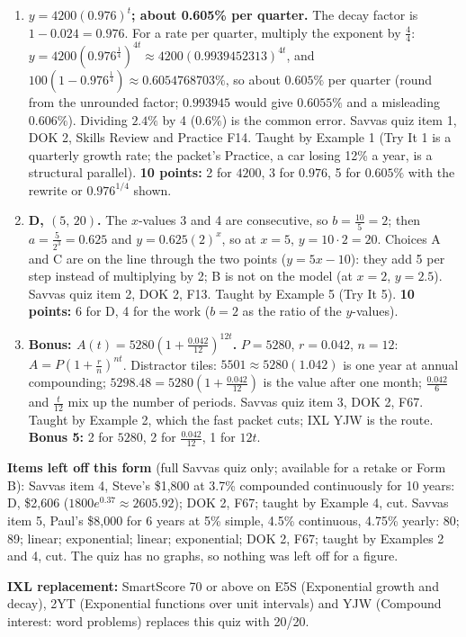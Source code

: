 \documentclass[11pt]{article}
\begin{document}
\begin{enumerate}
\item[\textbf{1.}] \textbf{$y=4200(0.976)^t$; about 0.605\% per quarter.} The decay factor is $1-0.024=0.976$. For a rate per quarter, multiply the exponent by $\frac44$: $y=4200\left(0.976^{\frac14}\right)^{4t}\approx4200(0.9939452313)^{4t}$, and $100\left(1-0.976^{\frac14}\right)\approx0.6054768703\%$, so about $0.605\%$ per quarter (round from the unrounded factor; $0.993945$ would give $0.6055\%$ and a misleading $0.606\%$). Dividing $2.4\%$ by 4 ($0.6\%$) is the common error. Savvas quiz item 1, DOK 2, Skills Review and Practice F14. Taught by Example 1 (Try It 1 is a quarterly growth rate; the packet's Practice, a car losing 12\% a year, is a structural parallel). \textbf{10 points:} 2 for $4200$, 3 for $0.976$, 5 for $0.605\%$ with the rewrite or $0.976^{1/4}$ shown.
\item[\textbf{2.}] \textbf{D, $(5,\,20)$.} The $x$-values 3 and 4 are consecutive, so $b=\frac{10}{5}=2$; then $a=\frac{5}{2^3}=0.625$ and $y=0.625(2)^x$, so at $x=5$, $y=10\cdot2=20$. Choices A and C are on the line through the two points ($y=5x-10$): they add 5 per step instead of multiplying by 2; B is not on the model (at $x=2$, $y=2.5$). Savvas quiz item 2, DOK 2, F13. Taught by Example 5 (Try It 5). \textbf{10 points:} 6 for D, 4 for the work ($b=2$ as the ratio of the $y$-values).
\item[\textbf{3.}] \textbf{Bonus: $A(t)=5280\left(1+\frac{0.042}{12}\right)^{12t}$.} $P=5280$, $r=0.042$, $n=12$: $A=P\left(1+\frac rn\right)^{nt}$. Distractor tiles: $5501\approx5280(1.042)$ is one year at annual compounding; $5298.48=5280\left(1+\frac{0.042}{12}\right)$ is the value after one month; $\frac{0.042}{6}$ and $\frac t{12}$ mix up the number of periods. Savvas quiz item 3, DOK 2, F67. Taught by Example 2, which the fast packet cuts; IXL YJW is the route. \textbf{Bonus 5:} 2 for $5280$, 2 for $\frac{0.042}{12}$, 1 for $12t$.
\end{enumerate}

\textbf{Items left off this form} (full Savvas quiz only; available for a retake or Form B): Savvas item 4, Steve's \$1,800 at 3.7\% compounded continuously for 10 years: D, \$2,606 ($1800e^{0.37}\approx2605.92$); DOK 2, F67; taught by Example 4, cut. Savvas item 5, Paul's \$8,000 for 6 years at 5\% simple, 4.5\% continuous, 4.75\% yearly: 80; 89; linear; exponential; linear; exponential; DOK 2, F67; taught by Examples 2 and 4, cut. The quiz has no graphs, so nothing was left off for a figure.

\textbf{IXL replacement:} SmartScore 70 or above on E5S (Exponential growth and decay), 2YT (Exponential functions over unit intervals) and YJW (Compound interest: word problems) replaces this quiz with 20/20.
\end{document}
